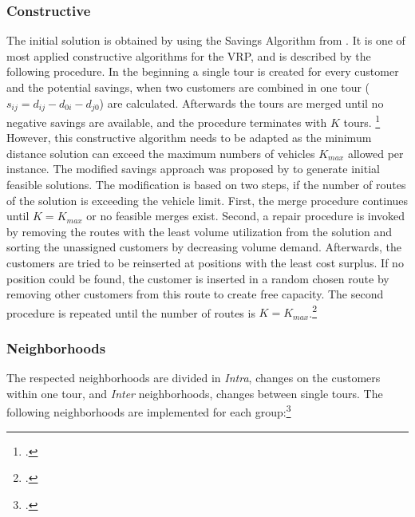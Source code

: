 \subsubsection{Constructive}
The initial solution is obtained by using the Savings Algorithm from \cite{clarke_scheduling_1964}. It is one of
most applied constructive algorithms for the \gls{VRP}, and is described by the following procedure. In the beginning
a single tour is created for every customer and the potential savings, when two customers are combined in one tour
($s_{ij} = d_{ij} - d_{0i} - d_{j0}$) are calculated.
Afterwards the tours are merged until no negative savings are available, and the
procedure terminates with $K$ tours. \footcite[cf.][]{clarke_scheduling_1964} However, this constructive algorithm needs to be adapted
as the minimum distance solution can exceed the maximum numbers of vehicles $K_{max}$ allowed per instance.
The modified savings approach was proposed by \cite{zhang_evolutionary_2015} to generate initial feasible solutions.
The modification is based on two steps, if the number of routes of the solution is exceeding the vehicle limit. First,
the merge procedure continues until $K = K_{max}$ or no feasible merges exist. Second, a repair procedure is invoked
by removing the routes with the least volume utilization from the solution and sorting the unassigned customers by
decreasing volume demand. Afterwards, the customers are tried to be reinserted at positions with the least
cost surplus. If no position could be found, the customer is inserted in a random chosen route by removing
other customers from this route to create free capacity. The second procedure is repeated until the
number of routes is $K = K_{max}$.\footcite[cf.][p.24]{zhang_evolutionary_2015}

\subsubsection{Neighborhoods}
\label{sec:neighborhoods}

The respected neighborhoods are divided in \textit{Intra}, changes on the customers within one tour, and \textit{Inter} neighborhoods,
changes between single tours. The following neighborhoods are implemented for each group:\footcite[cf.][pp. 89-90]{toth_vehicle_2014}

